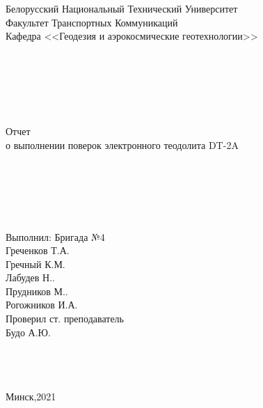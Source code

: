 \documentclass[a4paper]{article}
\begin{document}
\begin{titlepage}
\large{
\begin{center}

Белорусский Национальный Технический Университет\\
Факультет Транспортных Коммуникаций\\
Кафедра <<Геодезия и аэрокосмические геотехнологии>>\\
~\\
~\\
~\\
~\\
~\\
~\\
Отчет\\
о выполнении поверок электронного теодолита DT-2A\\
~\\
~\\
~\\
~\\
~\\
\end{center}

\begin{flushright}
Выполнил: Бригада №4\\
Греченков Т.А.\\
Гречный К.М.\\
Лабудев Н..\\
Прудников М..\\
Рогожников И.А.\\
Проверил ст. преподаватель\\
Будо А.Ю.
~\\
~\\
~\\
~\\
\begin{center}
Минск,2021
\end{center}

\end{flushright}
}
\end{titlepage}
\end{document}

